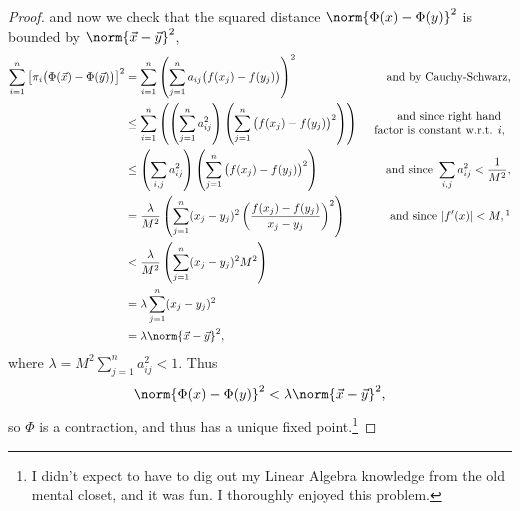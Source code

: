 \documentclass[12pt,letterpaper]{article}
\begin{document}
\begin{enumerate}
\begin{proof}
and now we check that the squared distance $\norm{\Phi(x)-\Phi(y)}^2$ is bounded by $\norm{\vec{x}-\vec{y}}^2$, 
\begin{align*}
\sum_{i=1}^n \big[\pi_i\big(\Phi(\vec{x})-\Phi(\vec{y})\big)\big]^2
&= \sum_{i=1}^n \left(\sum_{j=1}^n a_{ij}\big(f(x_j) -	f(y_j)\big)\right)^2 
	& \text{and by Cauchy-Schwarz,}\\
&\leq
	\sum_{i=1}^n \left( 
	\left(\sum_{j=1}^n a_{ij}^2\right)
	\left(\sum_{j=1}^n\big(f(x_j) -	f(y_j)\big)^2\right) 
	\right)
	& \begin{array}{r}
	\text{and since right hand } \\
	\text{factor is constant w.r.t. }i,
	\end{array}	 \\
&\leq
	\left(\sum_{i,j} a_{ij}^2\right)
	\left(\sum_{j=1}^n\big(f(x_j) -	f(y_j)\big)^2\right) 
	& \text{and since } \sum_{i,j} a_{ij}^2<\frac{1}{M^2}, \\
&= \frac{\lambda}{M^2}
	\left(\sum_{j=1}^n (x_j -	y_j)^2 \left(\frac{f(x_j) -	f(y_j)}{x_j -	y_j}\right)^2\right)
	& \text{and since } |f'(x)|<M,\footnotemark\\
&< \frac{\lambda}{M^2}
	\left(\sum_{j=1}^n (x_j -	y_j)^2 M^2\right) \\
&= \lambda\sum_{j=1}^n (x_j -	y_j)^2 \\
&=\lambda\norm{\vec{x}-\vec{y}}^2,
\end{align*}
where $\lambda=M^2\sum_{j=1}^n a_{ij}^2<1$. Thus  
$$\norm{\Phi(x)-\Phi(y)}^2<\lambda \norm{\vec{x}-\vec{y}}^2,$$
so $\Phi$ is a contraction, and thus has a unique fixed point.\footnote{I didn't expect to have to dig out my Linear Algebra knowledge from the old mental closet, and it was fun. I thoroughly enjoyed this problem.}
\end{proof}
\vfill
\pagebreak
\end{enumerate}
\end{document}
